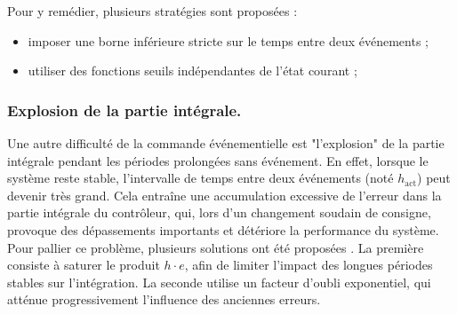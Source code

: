 Pour y remédier, plusieurs stratégies sont proposées :
\begin{itemize}
    \item imposer une borne inférieure stricte sur le temps entre deux événements ;
    \item utiliser des fonctions seuils indépendantes de l’état courant ;
\end{itemize}

\subsubsection{Explosion de la partie intégrale.}  

Une autre difficulté de la commande événementielle est "l’explosion" de la partie intégrale pendant les périodes prolongées sans événement. En effet, lorsque le système reste stable, l'intervalle de temps entre deux événements (noté $h_{\text{act}}$) peut devenir très grand. Cela entraîne une accumulation excessive de l’erreur dans la partie intégrale du contrôleur, qui, lors d’un changement soudain de consigne, provoque des dépassements importants et détériore la performance du système. Pour pallier ce problème, plusieurs solutions ont été proposées \cite{durand_further_2009}. La première consiste à saturer le produit $h \cdot e$, afin de limiter l’impact des longues périodes stables sur l’intégration. La seconde utilise un facteur d’oubli exponentiel, qui atténue progressivement l’influence des anciennes erreurs. 



 
